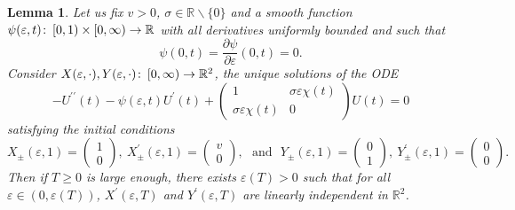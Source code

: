\documentclass{article}
\numberwithin{equation}{section}        %
\theoremstyle{bfnote}
\newtheorem{lem}[thm]{Lemma}                %
\theoremstyle{definition}
\theoremstyle{bfremark}
\newcommand{\col}{\colon \thinspace}        %
\newcommand{\R}{\mathbb{R}}                 %
\begin{document}
\begin{lem}     \label{lem: Point (ii) of admissible values}
    Let us fix $v > 0$, $\sigma \in \R \backslash \{0\}$ and a smooth function $\psi(\varepsilon,t) \col [0,1) \times [0,\infty) \rightarrow \R$ with all derivatives uniformly bounded and such that 
    \begin{equation*}
        \psi(0,t) = \frac{\partial \psi}{\partial \varepsilon}(0,t) = 0 .
    \end{equation*}
    Consider $X(\varepsilon,\cdot), Y(\varepsilon,\cdot) \col [0,\infty) \rightarrow \R^2$, the unique solutions of the ODE
    \begin{equation*}
        - U^{\prime\prime}(t) - \psi(\varepsilon,t) U^\prime(t) + \begin{pmatrix} 1 & \sigma \varepsilon \chi(t) \\ \sigma \varepsilon \chi(t) & 0 \end{pmatrix} U(t) = 0
    \end{equation*}
    satisfying the initial conditions
    \begin{equation*}
        X_\pm(\varepsilon,1) = 
        \begin{pmatrix}
            1 \\
            0
        \end{pmatrix}, ~ X^\prime_\pm(\varepsilon,1) = 
        \begin{pmatrix}
            v \\
            0
        \end{pmatrix}, ~~~ \text{and} ~~~ Y_\pm(\varepsilon,1) = 
        \begin{pmatrix}
            0\\
            1
        \end{pmatrix}, ~ Y^\prime_\pm(\varepsilon,1) = 
        \begin{pmatrix}
            0\\
            0
        \end{pmatrix}.
    \end{equation*}
    Then if $T \geq 0$ is large enough, there exists $\varepsilon(T) > 0$ such that for all $\varepsilon \in (0,\varepsilon(T))$, $X^\prime(\varepsilon,T)$ and $Y^\prime(\varepsilon,T)$ are linearly independent in $\R^2$.
\end{lem}
\end{document}
